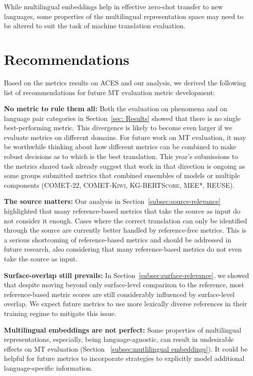 \documentclass[11pt]{article}
\begin{document}
While multilingual embeddings help in effective zero-shot transfer to new languages, some properties of the multilingual representation space may need to be altered to suit the task of machine translation evaluation. 

\section{Recommendations}
\label{sec:recommendations}
Based on the metrics results on \textsc{ACES} and our analysis, we derived the following list of recommendations for future MT evaluation metric development: 

\textbf{No metric to rule them all:} Both the evaluation on phenomena and on language pair categories in Section~\ref{sec: Results} showed that there is no single best-performing metric. This divergence is likely to become even larger if we evaluate metrics on different domains. For future work on MT evaluation, it may be worthwhile thinking about how different metrics can be combined to make robust decisions as to which is the best translation. This year's submissions to the metrics shared task already suggest that work in that direction is ongoing as some groups submitted metrics that combined ensembles of models or multiple components (\textsc{COMET-22}, \textsc{COMET-Kiwi}, \textsc{KG-BERTScore}, \textsc{MEE*}, \textsc{REUSE}).

\textbf{The source matters:} Our analysis in Section~\ref{subsec:source-relevance} highlighted that many reference-based metrics that take the source as input do not consider it enough. Cases where the correct translation can only be identified through the source are currently better handled by reference-free metrics. This is a serious shortcoming of reference-based metrics and should be addressed in future research, also considering that many reference-based metrics do not even take the source as input.

\textbf{Surface-overlap still prevails:} In Section~\ref{subsec:surface-relevance}, we showed that despite moving beyond only surface-level comparison to the reference, most reference-based metric scores are still considerably influenced by surface-level overlap. We expect future metrics to use more lexically diverse references in their training regime to mitigate this issue.

\textbf{Multilingual embeddings are not perfect:} Some properties of multilingual representations, especially, being language-agnostic, can result in undesirable effects on MT evaluation (Section ~\ref{subsec:mutlilingual embeddings}). It could be helpful for future metrics to incorporate strategies to explicitly model additional language-specific information.   
\end{document}
